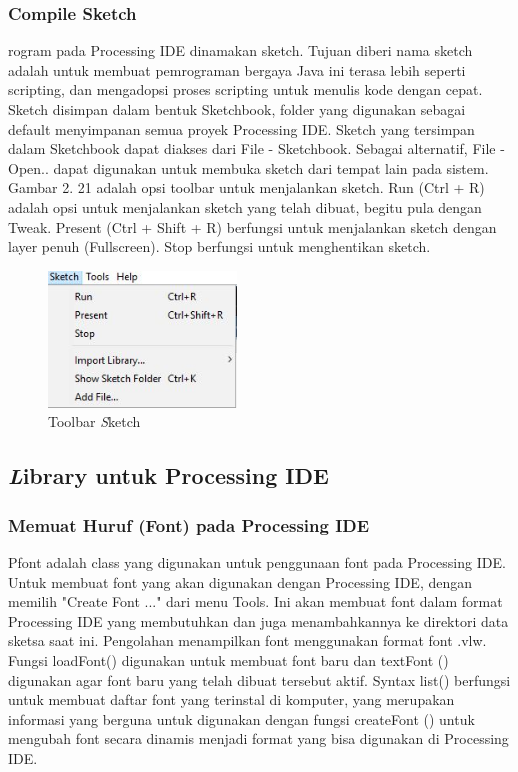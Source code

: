 \subsubsection{ Compile Sketch }
rogram pada Processing IDE dinamakan sketch. Tujuan diberi nama sketch adalah untuk membuat pemrograman bergaya Java ini terasa lebih seperti scripting, dan mengadopsi proses scripting untuk menulis kode dengan cepat. Sketch disimpan dalam bentuk Sketchbook, folder yang digunakan sebagai default menyimpanan semua proyek Processing IDE. Sketch yang tersimpan dalam Sketchbook dapat diakses dari File - Sketchbook. Sebagai alternatif, File - Open.. dapat digunakan untuk membuka sketch dari tempat lain pada sistem. Gambar 2. 21 adalah opsi toolbar untuk menjalankan sketch. Run (Ctrl + R) adalah opsi untuk menjalankan sketch yang telah dibuat, begitu pula dengan Tweak. Present (Ctrl + Shift + R) berfungsi untuk menjalankan sketch dengan layer penuh (Fullscreen). Stop berfungsi untuk menghentikan sketch. 

	\begin{figure}[H]
	\centering
	\includegraphics[width=5cm]{gambar/compile.jpg}
	\caption{Toolbar \emph Sketch}
\end{figure}

\subsection{\emph Library untuk Processing IDE }
\subsubsection{ Memuat Huruf (Font) pada Processing IDE }
Pfont adalah class yang digunakan untuk penggunaan font pada Processing IDE. Untuk membuat font yang akan digunakan dengan Processing IDE, dengan memilih "Create Font ..." dari menu Tools. Ini akan membuat font dalam format Processing IDE yang membutuhkan dan juga menambahkannya ke direktori data sketsa saat ini. Pengolahan menampilkan font menggunakan format font .vlw. Fungsi loadFont() digunakan untuk membuat font baru dan textFont () digunakan agar font baru yang telah dibuat tersebut aktif. Syntax list() berfungsi untuk membuat daftar font yang terinstal di komputer, yang merupakan informasi yang berguna untuk digunakan dengan fungsi createFont () untuk mengubah font secara dinamis menjadi format yang bisa digunakan di Processing IDE. 



